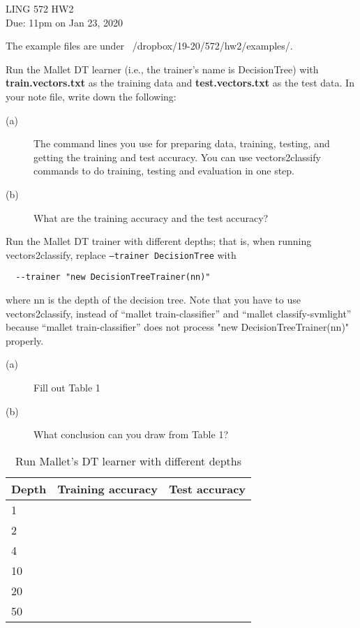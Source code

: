 \documentclass[11pt]{article}
\begin{document}
\begin{center}
\LARGE
LING 572 HW2\\
Due: 11pm on Jan 23, 2020\\
\end{center}


The example files are under ~/dropbox/19-20/572/hw2/examples/.

\vspace{0.3 in}
 Run the Mallet DT learner (i.e., the trainer's name
is DecisionTree) with 
{\bf train.vectors.txt} as the training data 
and {\bf test.vectors.txt} as the test data.
%
In your note file, write down the following:
\begin{description}
\item [(a)] The command lines you use for preparing data, training, testing, 
            and getting the training and test accuracy.
            You can use vectors2classify commands
            to do training, testing and evaluation in one step.

\item [(b)] What are the training accuracy and the test accuracy?
\end{description}



\vspace{0.7 in}

 Run the Mallet DT trainer with different depths; that is,
when running vectors2classify, replace 
{\tt --trainer DecisionTree}
with
\begin{verbatim}
  --trainer "new DecisionTreeTrainer(nn)"
\end{verbatim}
where nn is the depth of the decision tree. Note that you have to 
use vectors2classify, instead of ``mallet train-classifier'' and
``mallet classify-svmlight'' because ``mallet train-classifier''
does not process "new DecisionTreeTrainer(nn)" properly.


\begin{description}
\item [(a)] Fill out Table 1
\item [(b)] What conclusion can you draw from Table 1?
\end{description}

\begin{table}[h]
\centering
\caption{Run Mallet's DT learner with different depths}
\label{table1}
\begin{tabular}{|l|l|l|} \hline
Depth   & Training accuracy & Test accuracy \\ \hline
1       &    &  \\ \hline
2       &    &  \\ \hline
4       &    &  \\ \hline
10      &    &  \\ \hline
20      &    &  \\ \hline
50      &    &  \\ \hline
\end{tabular}

\end{table}
\end{document}

